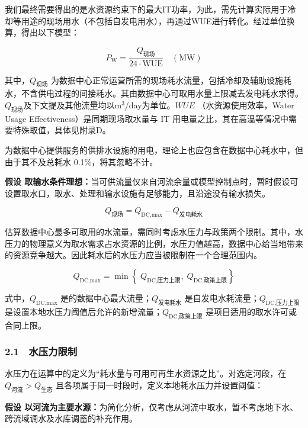我们最终需要得出的是水资源约束下的最大IT功率，为此，需先计算实际用于冷却等用途的现场用水（不包括自发电用水），再通过WUE进行转化。经过单位换算，得出以下模型：

\[
P_{\text{W}}= \frac{Q_{\text{现场}}}{24\cdot\mathrm{WUE}}\quad(\text{MW})
\]

其中，$Q_{\text{现场}}$ 为数据中心正常运营所需的现场耗水流量，包括冷却及辅助设施耗水，不含供电过程的间接耗水。其由数据中心可取用水量上限减去发电耗水求得。$Q_{\text{现场}}$及下文提及其他流量均以m$^3$/day为单位。$WUE$ （水资源使用效率，Water Usage Effectiveness）是同期现场取水量与 IT 用电量之比，其在高温等情况中需要特殊取值，具体见附录D。\cite{q1bref04}

为数据中心提供服务的供排水设施的用电，理论上也应包含在数据中心耗水中，但由于其不及总耗水 0.1\%，将其忽略不计。\cite{q1bref09}

\begin{asum}
\textbf{假设 取输水条件理想：}当可供流量仅来自河流余量或模型控制点时，暂时假设可设置取水口，取水、处理和输水设施有足够能力，且沿途没有输水损失。
\end{asum}

\[
Q_{\text{现场}}=Q_{\text{DC,max}}-Q_{\text{发电耗水}}
\]

估算数据中心最多可取用的水流量，需同时考虑水压力与政策两个限制。其中，水压力的物理意义为取水需求占水资源的比例，水压力值越高，数据中心给当地带来的资源竞争越大。\cite{q1bref01}因此耗水后的水压力应当被限制在一个合理范围内。

\[
Q_{\text{DC,max}}= \min\left\{\;Q_{\text{DC,压力上限}},\;Q_{\text{DC,政策上限}}\right\}
\]

式中，$Q_{\text{DC,max}}$ 是的数据中心最大流量；$Q_{\text{发电耗水}}$ 是自发电水耗流量；$Q_{\text{DC,压力上限}}$ 是设置本地水压力阈值后允许的新增流量；$Q_{\text{DC,政策上限}}$ 是项目适用的取水许可或合同上限。

\subsubsection{2.1　水压力限制}

水压力在运算中的定义为“耗水量与可用可再生水资源之比”。\cite{q1bref01}对选定河段，在 $Q_{\text{河流}} > Q_{\text{生态}}$ 且各项属于同一时段时，定义本地耗水压力并设置阈值：

\begin{asum}
\textbf{假设 以河流为主要水源：}为简化分析，仅考虑从河流中取水，暂不考虑地下水、跨流域调水及水库调蓄的补充作用。
\end{asum}

